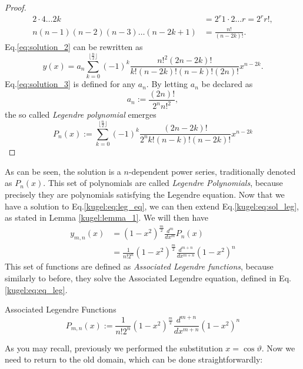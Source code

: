 \begin{proof}
\begin{align}
    2 \cdot 4  \hdots 2k &= 2^r 1\cdot2 \hdots r = 2^r r!\label{eq:2_sub_recursion}, \\
    n(n-1)(n-2)(n-3) \hdots (n-2k+1) &= \frac{n!}{(n-2k)!}\label{eq:3_sub_recursion}.
    \end{align}
    Eq.\eqref{eq:solution_2} can be rewritten as
    \begin{equation}\label{eq:solution_3}
    y(x)=a_n \sum_{k=0}^{\lfloor \frac{n}{2} \rfloor} (-1)^k \frac{n!^2(2n-2k)!}{k!(n-2k)!(n-k)!(2n)!}  x^{n-2k}.
    \end{equation}
    Eq.\eqref{eq:solution_3} is defined for any $a_n$. By letting $a_n$ be declared as
    \begin{equation*}
    a_{n} := \frac{(2n)!}{2^n n!^2},
    \end{equation*}
    the so called \emph{Legendre polynomial} emerges
    \begin{equation}\label{eq:leg_poly}
    P_n(x):=\sum_{k=0}^{\lfloor \frac{n}{2} \rfloor} (-1)^k \frac{(2n-2k)!}{2^n k! (n-k)!(n-2k)!} x^{n-2k} 
    \end{equation}
\end{proof}
As can be seen, the solution is a $n$-dependent power series, traditionally denoted as $P_n(x)$. This set of polynomials are called \emph{Legendre Polynomials}, because precisely they are polynomials satisfying the Legendre equation.\newline
Now that we have a solution to Eq.\eqref{kugel:eq:leg_eq}, we can then extend Eq.\eqref{kugel:eq:sol_leg}, as stated in Lemma \ref{kugel:lemma_1}. We will then have
\begin{align*}
y_{m,n}(x) &= (1-x^2)^{\frac{m}{2}}\frac{d^m}{dx^m}P_n(x) \\
&= \frac{1}{n!2^n}(1-x^2)^{\frac{m}{2}}\frac{d^{m+n}}{dx^{m+n}}(1-x^2)^n 
\end{align*}
This set of functions are defined as \emph{Associated Legendre functions}, because similarly to before, they solve the Associated Legendre equation, defined in Eq.\eqref{kugel:eq:eq_leg}.
\begin{definition}{Associated Legendre Functions}
\begin{equation}\label{kugel:eq:associated_leg_func}
P_{m,n}(x) := \frac{1}{n!2^n}(1-x^2)^{\frac{m}{2}}\frac{d^{m+n}}{dx^{m+n}}(1-x^2)^n 
\end{equation}
\end{definition}
As you may recall, previously we performed the substitution $x=\cos \vartheta$. Now we need to return to the old domain, which can be done straightforwardly:
